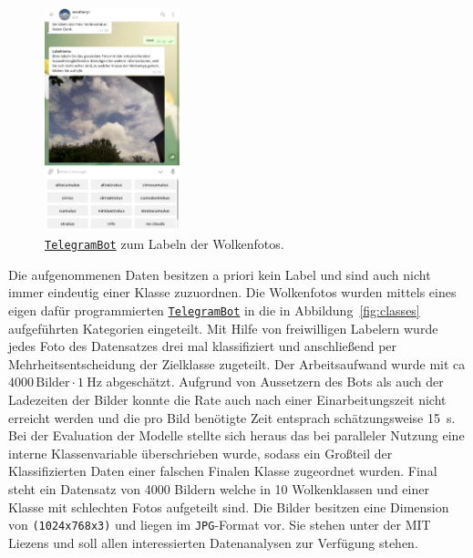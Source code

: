 \begin{figure}
		\vspace{-1.4cm}
		\centering
		\includegraphics[width=0.35\textwidth]{pictures/telegram.pdf}
		\caption{\href{https://telegram.me/weatherpi_bot}{\texttt{TelegramBot}} zum Labeln der Wolkenfotos.}
		\label{fig:}
		\vspace{-1.0cm}
\end{figure}
Die aufgenommenen Daten besitzen a priori kein Label und sind auch nicht immer
eindeutig einer Klasse zuzuordnen.
Die Wolkenfotos wurden mittels eines eigen dafür programmierten
\href{https://telegram.me/weatherpi_bot}{\texttt{TelegramBot}} in
die in Abbildung~\ref{fig:classes} aufgeführten Kategorien eingeteilt.
Mit Hilfe von freiwilligen Labelern wurde jedes Foto des Datensatzes drei mal
klassifiziert und anschließend per Mehrheitsentscheidung der Zielklasse 
zugeteilt.
Der Arbeitsaufwand wurde mit ca $\num{4000} \, \text{Bilder} \cdot \SI{1}{\hertz}$
abgeschätzt.
Aufgrund von Aussetzern des Bots als auch der Ladezeiten der Bilder konnte die Rate
auch nach einer Einarbeitungszeit nicht erreicht werden und die pro Bild benötigte Zeit entsprach schätzungsweise
\SI{15}{\second}.
Bei der Evaluation der Modelle stellte sich heraus das bei paralleler Nutzung
eine interne Klassenvariable überschrieben wurde, sodass ein Großteil der
Klassifizierten Daten einer falschen Finalen Klasse zugeordnet wurden. 
Final steht ein Datensatz von \num{4000} Bildern welche in 10 Wolkenklassen und
einer Klasse mit schlechten Fotos aufgeteilt sind. Die Bilder besitzen eine Dimension 
von \texttt{(1024x768x3)} und liegen im \texttt{JPG}-Format vor.
Sie stehen unter der MIT Liezens und soll allen interessierten 
Datenanalysen zur Verfügung stehen.

